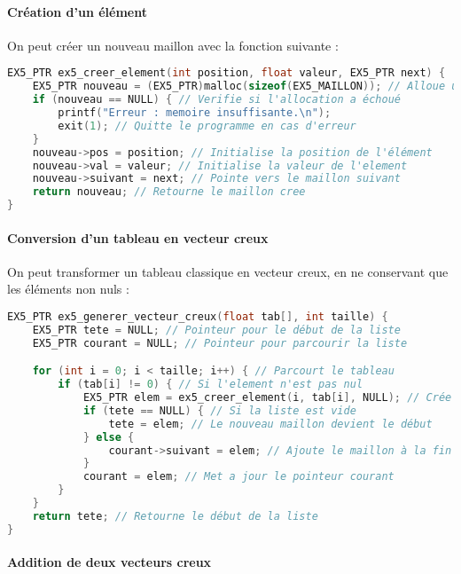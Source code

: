 \documentclass[a4paper,12pt]{article}
\begin{document}
\paragraph{Création d’un élément}

On peut créer un nouveau maillon avec la fonction suivante :

\begin{lstlisting}[language=C, caption={Création d’un maillon}]
EX5_PTR ex5_creer_element(int position, float valeur, EX5_PTR next) {
    EX5_PTR nouveau = (EX5_PTR)malloc(sizeof(EX5_MAILLON)); // Alloue un nouveau maillon
    if (nouveau == NULL) { // Verifie si l'allocation a échoué
        printf("Erreur : memoire insuffisante.\n");
        exit(1); // Quitte le programme en cas d'erreur
    }
    nouveau->pos = position; // Initialise la position de l'élément
    nouveau->val = valeur; // Initialise la valeur de l'element
    nouveau->suivant = next; // Pointe vers le maillon suivant
    return nouveau; // Retourne le maillon cree
}
\end{lstlisting}

\paragraph{Conversion d’un tableau en vecteur creux}

On peut transformer un tableau classique en vecteur creux, en ne conservant que les éléments non nuls :

\begin{lstlisting}[language=C, caption={Conversion en vecteur creux}]
EX5_PTR ex5_generer_vecteur_creux(float tab[], int taille) {
    EX5_PTR tete = NULL; // Pointeur pour le début de la liste
    EX5_PTR courant = NULL; // Pointeur pour parcourir la liste

    for (int i = 0; i < taille; i++) { // Parcourt le tableau
        if (tab[i] != 0) { // Si l'element n'est pas nul
            EX5_PTR elem = ex5_creer_element(i, tab[i], NULL); // Crée un nouveau maillon
            if (tete == NULL) { // Si la liste est vide
                tete = elem; // Le nouveau maillon devient le début
            } else {
                courant->suivant = elem; // Ajoute le maillon à la fin
            }
            courant = elem; // Met a jour le pointeur courant
        }
    }
    return tete; // Retourne le début de la liste
}
\end{lstlisting}

\paragraph{Addition de deux vecteurs creux}
\end{document}
